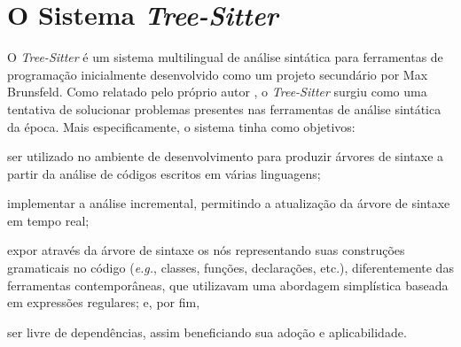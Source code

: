 \documentclass
  [11pt, a4paper, english, openright, sumario = tradicional, twoside, brazil]
  {abntex2}
\begin{document}

  \chapter{O Sistema \textit{Tree-Sitter}}

  O \textit{Tree-Sitter} é um sistema multilingual de análise sintática para
  ferramentas de programação inicialmente desenvolvido como um projeto
  secundário por Max Brunsfeld. Como relatado pelo próprio autor
  \cite{github-2017-tree}, o \textit{Tree-Sitter} surgiu como uma tentativa de
  solucionar problemas presentes nas ferramentas de análise sintática da época.
  Mais especificamente, o sistema tinha como objetivos:
  \begin{inparaenum}
    \item ser utilizado no ambiente de desenvolvimento para produzir árvores de
          sintaxe a partir da análise de códigos escritos em várias linguagens;
    \item implementar a análise incremental, permitindo a atualização da árvore
          de sintaxe em tempo real;
    \item expor através da árvore de sintaxe os nós representando suas
          construções gramaticais no código (\textit{e.g.}, classes, funções,
          declarações, etc.), diferentemente das ferramentas contemporâneas,
          que utilizavam uma abordagem simplística baseada em expressões
          regulares; e, por fim,
    \item ser livre de dependências, assim beneficiando sua adoção e
          aplicabilidade.
  \end{inparaenum}
\end{document}
